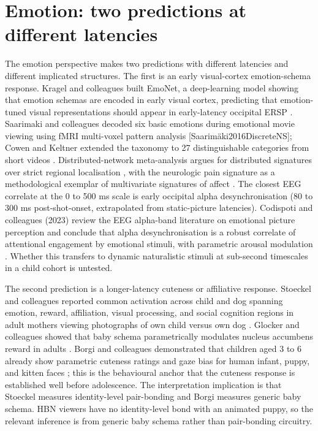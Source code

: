 \documentclass[preprint,12pt]{elsarticle}
\begin{document}
\section{Emotion: two predictions at different latencies}

The emotion perspective makes two predictions with different latencies and different implicated structures. The first is an early visual-cortex emotion-schema response. Kragel and colleagues built EmoNet, a deep-learning model showing that emotion schemas are encoded in early visual cortex, predicting that emotion-tuned visual representations should appear in early-latency occipital ERSP \cite{Kragel2018EmotionSA}. Saarimaki and colleagues decoded six basic emotions during emotional movie viewing using fMRI multi-voxel pattern analysis [Saarimäki2016DiscreteNS]; Cowen and Keltner extended the taxonomy to 27 distinguishable categories from short videos \cite{Cowen2017SelfreportC2}. Distributed-network meta-analysis argues for distributed signatures over strict regional localisation \cite{Lindquist2012TheBB}, with the neurologic pain signature as a methodological exemplar of multivariate signatures of affect \cite{Wager2013AnFN}. The closest EEG correlate at the 0 to 500 ms scale is early occipital alpha desynchronisation (80 to 300 ms post-shot-onset, extrapolated from static-picture latencies). Codispoti and colleagues (2023) review the EEG alpha-band literature on emotional picture perception and conclude that alpha desynchronisation is a robust correlate of attentional engagement by emotional stimuli, with parametric arousal modulation \cite{Codispoti2023AlphabandOA}. Whether this transfers to dynamic naturalistic stimuli at sub-second timescales in a child cohort is untested.

The second prediction is a longer-latency cuteness or affiliative response. Stoeckel and colleagues reported common activation across child and dog spanning emotion, reward, affiliation, visual processing, and social cognition regions in adult mothers viewing photographs of own child versus own dog \cite{Stoeckel2014PatternsOB}. Glocker and colleagues showed that baby schema parametrically modulates nucleus accumbens reward in adults \cite{Glocker2009BabySM}. Borgi and colleagues demonstrated that children aged 3 to 6 already show parametric cuteness ratings and gaze bias for human infant, puppy, and kitten faces \cite{Borgi2014BabySI}; this is the behavioural anchor that the cuteness response is established well before adolescence. The interpretation implication is that Stoeckel measures identity-level pair-bonding and Borgi measures generic baby schema. HBN viewers have no identity-level bond with an animated puppy, so the relevant inference is from generic baby schema rather than pair-bonding circuitry.
\end{document}
